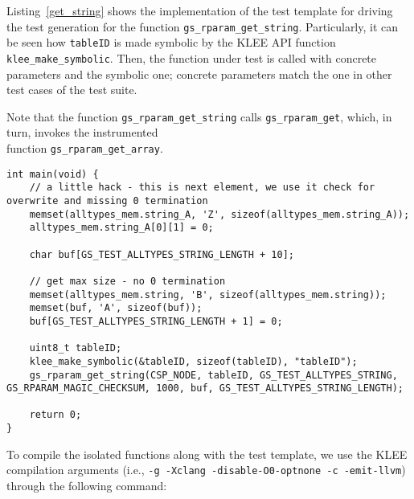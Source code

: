 Listing~\ref{get_string} shows the implementation of the test template for driving the test generation for the function \texttt{gs\_rparam\_get\_string}. Particularly, it can be seen how \texttt{tableID} is made symbolic by the KLEE API function \texttt{klee\_make\_symbolic}. Then, the function under test is called with concrete parameters and the symbolic one; concrete parameters match the one in other test cases of the \PARAM test suite.

Note that the function \texttt{gs\_rparam\_get\_string} calls \texttt{gs\_rparam\_get}, which, in turn, invokes the instrumented \\
function \texttt{gs\_rparam\_get\_array}.

\begin{lstlisting}[style=CStyle,float=t, caption=Test template for function gs\_rparam\_get\_string., label=get_string]
int main(void) {
    // a little hack - this is next element, we use it check for overwrite and missing 0 termination
    memset(alltypes_mem.string_A, 'Z', sizeof(alltypes_mem.string_A));
    alltypes_mem.string_A[0][1] = 0;

    char buf[GS_TEST_ALLTYPES_STRING_LENGTH + 10];

    // get max size - no 0 termination
    memset(alltypes_mem.string, 'B', sizeof(alltypes_mem.string));
    memset(buf, 'A', sizeof(buf));
    buf[GS_TEST_ALLTYPES_STRING_LENGTH + 1] = 0;

    uint8_t tableID;
    klee_make_symbolic(&tableID, sizeof(tableID), "tableID");
    gs_rparam_get_string(CSP_NODE, tableID, GS_TEST_ALLTYPES_STRING, GS_RPARAM_MAGIC_CHECKSUM, 1000, buf, GS_TEST_ALLTYPES_STRING_LENGTH);

    return 0;
}
\end{lstlisting}

To compile the isolated functions along with the test template, we use the KLEE compilation arguments (i.e., \texttt{-g -Xclang -disable-O0-optnone -c -emit-llvm}) through the following command:

